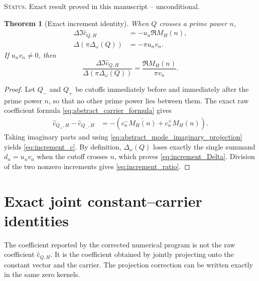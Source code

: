 \documentclass[11pt]{amsart}
\numberwithin{equation}{section}
\theoremstyle{plain}
\newtheorem{theorem}{Theorem}[section]
\theoremstyle{definition}
\theoremstyle{remark}
\newcommand{\1}{\mathbf{1}}
\newcommand{\statusnote}[1]{%
  \par\smallskip\noindent
  \begingroup\footnotesize\textsc{Status.} #1\endgroup
  \par\smallskip}
\begin{document}
\statusnote{Exact result proved in this manuscript -- unconditional.}
\begin{theorem}[Exact increment identity]
\label{thm:increment_identity}
When \(Q\) crosses a prime power \(n\),
\begin{align}
\Delta\Im\widehat c_{Q,H}
&=
-u_n\Re M_H(n),
\label{eq:increment_c}
\\
\Delta\left(\pi\Delta_\omega(Q)\right)
&=
-\pi u_nv_n.
\label{eq:increment_Delta}
\end{align}
If \(u_nv_n\neq0\), then
\begin{equation}
\boxed{
\frac{
\Delta\Im\widehat c_{Q,H}
}{
\Delta(\pi\Delta_\omega(Q))
}
=
\frac{\Re M_H(n)}{\pi v_n}.
}
\label{eq:increment_ratio}
\end{equation}
\end{theorem}

\begin{proof}
Let \(Q_-\) and \(Q_+\) be cutoffs immediately before and immediately
after the prime power \(n\), so that no other prime power lies between
them.  The exact raw coefficient formula
\eqref{eq:abstract_carrier_formula} gives
\begin{align}
\widehat c_{Q_+,H}-\widehat c_{Q_-,H}
&=
-\left(
c_n^-\overline{M_H(n)}+c_n^+M_H(n)
\right).
\label{eq:increment_raw_complex}
\end{align}
Taking imaginary parts and using
\eqref{eq:abstract_mode_imaginary_projection} yields
\eqref{eq:increment_c}.  By definition,
\(\Delta_\omega(Q)\) loses exactly the single summand
\(d_n=u_nv_n\) when the cutoff crosses \(n\), which proves
\eqref{eq:increment_Delta}.  Division of the two nonzero increments gives
\eqref{eq:increment_ratio}.
\end{proof}


\section{Exact joint constant--carrier identities}
\label{sec:exact_joint_carrier_identities}

The coefficient reported by the corrected numerical program is not the
raw coefficient \(\widehat c_{Q,H}\).  It is the coefficient obtained by
jointly projecting onto the constant vector and the carrier.  The
projection correction can be written exactly in the same zero kernels.
\end{document}
